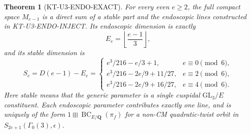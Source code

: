 \documentclass[11pt,a4paper]{article}
\newtheorem{theorem}{Theorem}[section]
\theoremstyle{definition}
\begin{document}
\begin{theorem}[KT-U3-ENDO-EXACT]
For every even $e\ge2$, the full compact space $M_{e-1}$ is a direct
sum of a stable part and the endoscopic lines constructed in
KT-U3-ENDO-INJECT. Its endoscopic dimension is exactly
\[
             E_e=\left\lfloor\frac{e-1}{3}\right\rfloor,
\]
and its stable dimension is
\[
 S_e=D(e-1)-E_e=
 \begin{cases}
 e^3/216-e/3+1,&e\equiv0\pmod6,\\
 e^3/216-2e/9+11/27,&e\equiv2\pmod6,\\
 e^3/216-2e/9+16/27,&e\equiv4\pmod6.
 \end{cases}                                                   \tag{KT-E.3}
\]
Here stable means that the generic parameter is a single cuspidal
$\mathrm{GL}_3/E$ constituent. Each endoscopic parameter contributes
exactly one line, and is uniquely of the form
$1\boxplus\operatorname{BC}_{E/\mathbf Q}(\pi_f)$ for a non-CM
quadratic-twist orbit in $S_{2e+1}(\Gamma_0(3),\epsilon)$.
\end{theorem}
\end{document}
